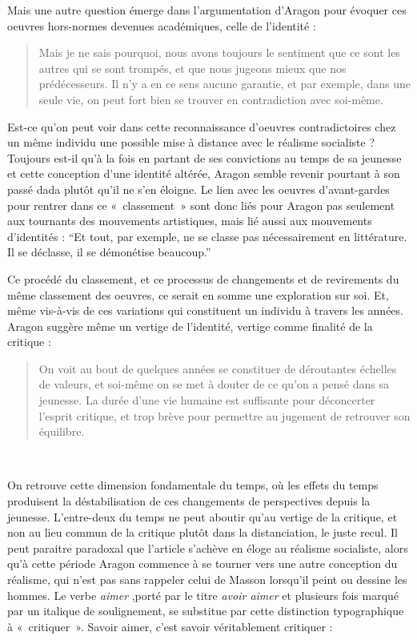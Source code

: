  Mais une autre question émerge dans l’argumentation d’Aragon pour évoquer ces oeuvres hors-normes devenues académiques, celle de l’identité :  
 \begin{quote}
  Mais je ne sais pourquoi, nous avons toujours le sentiment que ce sont les autres qui se sont trompés, et que nous jugeons mieux que nos prédécesseurs. Il n’y a en ce sens aucune garantie, et par exemple, dans une seule vie, on peut fort bien se trouver en contradiction avec soi-même.    
 \end{quote}

	Est-ce qu’on peut voir dans cette reconnaissance d’oeuvres contradictoires chez un même individu une possible mise à distance avec le réalisme socialiste ? Toujours est-il qu’à la fois en partant de ses convictions au temps de sa jeunesse et cette conception d’une identité altérée, Aragon semble revenir pourtant à son passé dada plutôt qu’il ne s’en éloigne. Le lien avec les oeuvres d’avant-gardes pour rentrer dans ce « classement » sont donc liés pour Aragon pas seulement aux tournants des mouvements artistiques, mais lié aussi aux mouvements d’identités : \enquote{Et tout, par exemple, ne se classe pas nécessairement en littérature. Il se déclasse, il se démonétise beaucoup.}

Ce procédé du classement, et ce processus de changements et de revirements du même classement des oeuvres, ce serait en somme une exploration sur soi. Et, même vis-à-vis de ces variations qui constituent un individu à travers les années. Aragon suggère même un vertige de l’identité, vertige comme finalité de la critique : 

\begin{quote}
 On voit au bout de quelques années se constituer de déroutantes échelles de valeurs, et soi-même on se met à douter de ce qu’on a pensé dans sa jeunesse. La durée d’une vie humaine est suffisante pour déconcerter l’esprit critique, et trop brève pour permettre au jugement de retrouver son équilibre.   
\end{quote}
 

	 On retrouve cette dimension fondamentale du temps, où les effets du temps produisent la déstabilisation de ces changements de perspectives depuis la jeunesse. L’entre-deux du temps ne peut aboutir qu’au vertige de la critique, et non au lieu commun de la critique plutôt dans la distanciation, le juste recul. Il peut paraitre paradoxal que l’article s’achève en éloge au réalisme socialiste, alors qu’à cette période Aragon commence à se tourner vers une autre conception du réalisme, qui n’est pas sans rappeler celui de Masson lorsqu’il peint ou dessine les hommes. Le verbe \emph{aimer} ,porté par le titre \emph{avoir aimer} et plusieurs fois marqué par un italique de soulignement, se substitue par cette distinction typographique à « critiquer ». Savoir aimer, c’est savoir véritablement critiquer :  

